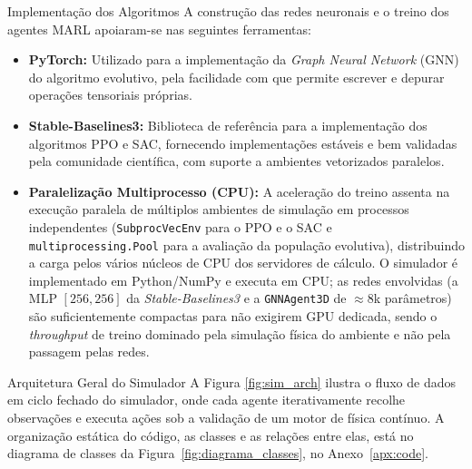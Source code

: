 \documentclass[12pt,reqno, twoside]{amsbook}
\makeatletter
\def\subsection{\@startsection{subsection}{2}%
      \z@{.5\linespacing\@plus.7\linespacing}{.25\linespacing}%
      {\normalfont\bfseries\flushleft}}
\theoremstyle{plain}
\numberwithin{equation}{chapter}
\numberwithin{section}{chapter}
\numberwithin{table}{chapter}
\numberwithin{figure}{chapter}
\makeatother
\begin{document}
\subsection{Implementação dos Algoritmos}
A construção das redes neuronais e o treino dos agentes MARL apoiaram-se nas seguintes ferramentas:
\begin{itemize}
    \item \textbf{PyTorch:} Utilizado para a implementação da \textit{Graph Neural Network} (GNN) do algoritmo evolutivo, pela facilidade com que permite escrever e depurar operações tensoriais próprias.
    \item \textbf{Stable-Baselines3:} Biblioteca de referência para a implementação dos algoritmos PPO e SAC, fornecendo implementações estáveis e bem validadas pela comunidade científica, com suporte a ambientes vetorizados paralelos.
    \item \textbf{Paralelização Multiprocesso (CPU):} A aceleração do treino assenta na execução paralela de múltiplos ambientes de simulação em processos independentes (\texttt{SubprocVecEnv} para o PPO e o SAC e \texttt{multiprocessing.Pool} para a avaliação da população evolutiva), distribuindo a carga pelos vários núcleos de CPU dos servidores de cálculo. O simulador é implementado em Python/NumPy e executa em CPU; as redes envolvidas (a MLP $[256,256]$ da \textit{Stable-Baselines3} e a \texttt{GNNAgent3D} de $\approx 8$k parâmetros) são suficientemente compactas para não exigirem GPU dedicada, sendo o \textit{throughput} de treino dominado pela simulação física do ambiente e não pela passagem pelas redes.
\end{itemize}

\subsection{Arquitetura Geral do Simulador}
A Figura \ref{fig:sim_arch} ilustra o fluxo de dados em ciclo fechado do simulador, onde cada agente iterativamente recolhe observações e executa ações sob a validação de um motor de física contínuo. A organização estática do código, as classes e as relações entre elas, está no diagrama de classes da Figura~\ref{fig:diagrama_classes}, no Anexo~\ref{apx:code}.
\end{document}
